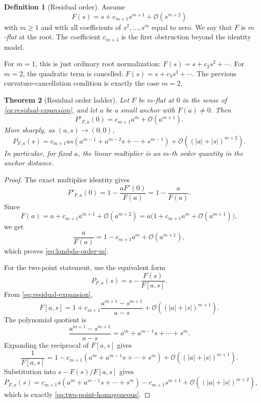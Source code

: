 \documentclass[11pt]{article}
\newtheorem{theorem}{Theorem}[section]
\theoremstyle{definition}
\newtheorem{definition}[theorem]{Definition}
\newcommand{\Oterm}{\mathcal{O}}
\begin{document}
\begin{definition}[Residual order]
Assume
\begin{equation}\label{eq:residual-expansion}
F(s)=s+c_{m+1}s^{m+1}+\Oterm(s^{m+2})
\end{equation}
with $m\geq 1$ and with all coefficients of $s^2,\ldots,s^m$ equal to zero. We say that $F$ is \emph{$m$-flat} at the root. The coefficient $c_{m+1}$ is the first obstruction beyond the identity model.
\end{definition}

For $m=1$, this is just ordinary root normalization: $F(s)=s+c_2s^2+\cdots$. For $m=2$, the quadratic term is cancelled: $F(s)=s+c_3s^3+\cdots$. The previous curvature-cancellation condition is exactly the case $m=2$.

\begin{theorem}[Residual order ladder]\label{thm:residual-ladder}
Let $F$ be $m$-flat at $0$ in the sense of \eqref{eq:residual-expansion}, and let $a$ be a small anchor with $F(a)\neq0$. Then
\begin{equation}\label{eq:lambda-order-m}
P'_{F,a}(0)=c_{m+1}a^m+\Oterm(a^{m+1}).
\end{equation}
More sharply, as $(a,s)\to(0,0)$,
\begin{equation}\label{eq:two-point-homogeneous}
P_{F,a}(s)=c_{m+1}as(a^{m-1}+a^{m-2}s+\cdots+s^{m-1})+
\Oterm((|a|+|s|)^{m+2}).
\end{equation}
In particular, for fixed $a$, the linear multiplier is an $m$-th order quantity in the anchor distance.
\end{theorem}

\begin{proof}
The exact multiplier identity gives
\[
P'_{F,a}(0)=1-\frac{aF'(0)}{F(a)}=1-\frac{a}{F(a)}.
\]
Since
\[
F(a)=a+c_{m+1}a^{m+1}+\Oterm(a^{m+2})
=a\bigl(1+c_{m+1}a^m+\Oterm(a^{m+1})\bigr),
\]
we get
\[
\frac{a}{F(a)}=1-c_{m+1}a^m+\Oterm(a^{m+1}),
\]
which proves \eqref{eq:lambda-order-m}.

For the two-point statement, use the equivalent form
\[
P_{F,a}(s)=s-\frac{F(s)}{F[a,s]}.
\]
From \eqref{eq:residual-expansion},
\[
F[a,s]
=1+c_{m+1}\frac{a^{m+1}-s^{m+1}}{a-s}+\Oterm((|a|+|s|)^{m+1}).
\]
The polynomial quotient is
\[
\frac{a^{m+1}-s^{m+1}}{a-s}=a^m+a^{m-1}s+\cdots+s^m.
\]
Expanding the reciprocal of $F[a,s]$ gives
\[
\frac{1}{F[a,s]}
=1-c_{m+1}(a^m+a^{m-1}s+\cdots+s^m)+\Oterm((|a|+|s|)^{m+1}).
\]
Substitution into $s-F(s)/F[a,s]$ gives
\[
P_{F,a}(s)
=c_{m+1}s(a^m+a^{m-1}s+\cdots+s^m)-c_{m+1}s^{m+1}
+\Oterm((|a|+|s|)^{m+2}),
\]
which is exactly \eqref{eq:two-point-homogeneous}.
\end{proof}
\end{document}
